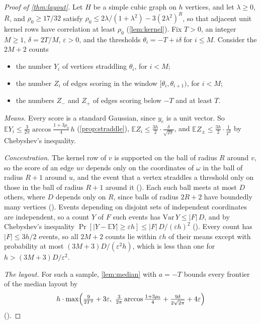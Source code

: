 \documentclass[11pt]{article}
\theoremstyle{plain}
\theoremstyle{definition}
\theoremstyle{remark}
\newcommand{\card}[1]{\lvert #1\rvert}
\begin{document}
\begin{proof}[Proof of \cref{thm:layout}]
Let $H$ be a simple cubic graph on $h$ vertices, and let $\lambda \ge 0$, $R$, and
$\rho_0 \ge 17/32$ satisfy $\rho_0 \le 2\lambda/(1+\lambda^2) - 3(2\lambda^2)^R$, so that adjacent
unit kernel rows have correlation at least $\rho_0$ (\cref{lem:kernel}). Fix $T > 0$, an integer
$M \ge 1$, $\delta = 2T/M$, $\varepsilon > 0$, and the thresholds $\theta_i = -T + i\delta$ for
$i \le M$. Consider the $2M + 2$ counts
\begin{itemize}
\item the number $Y_i$ of vertices straddling $\theta_i$, for $i < M$;
\item the number $Z_i$ of edges scoring in the window $[\theta_i, \theta_{i+1})$, for $i < M$;
\item the numbers $Z_-$ and $Z_+$ of edges scoring below $-T$ and at least $T$.
\end{itemize}
\emph{Means.} Every score is a standard Gaussian, since $y_e$ is a unit vector. So
$\mathbb{E} Y_i \le \frac{3}{2\pi}\arccos\frac{1+3\rho_0}{4}\,h$ (\cref{prop:straddle}),
$\mathbb{E} Z_i \le \frac{3h}{2}\cdot\frac{\delta}{\sqrt{2\pi}}$, and
$\mathbb{E} Z_\pm \le \frac{3h}{2}\cdot\frac{1}{T^2}$ by Chebyshev's inequality.

\emph{Concentration.} The kernel row of $v$ is supported on the ball of radius $R$ around $v$, so
the score of an edge $uv$ depends only on the coordinates of $\omega$ in the ball of radius $R + 1$
around $u$, and the event that a vertex straddles a threshold only on those in the ball of radius
$R + 1$ around it (). Each such ball meets at most
$D$ others, where $D$ depends only on $R$, since balls of radius $2R + 2$ have boundedly many
vertices (). Events depending on disjoint sets of
independent coordinates are independent, so a count $Y$ of $F$ such events has
$\mathrm{Var}\,Y \le \card F\, D$, and by Chebyshev's inequality
$\Pr[\card{Y - \mathbb E Y} \ge \varepsilon h] \le \card F\, D/(\varepsilon h)^2$
(). Every count has $\card F \le 3h/2$ events, so all
$2M + 2$ counts lie within $\varepsilon h$ of their means except with probability at most
$(3M + 3)D/(\varepsilon^2 h)$, which is less than one for $h > (3M+3)D/\varepsilon^2$.

\emph{The layout.} For such a sample, \cref{lem:median} with $a = -T$ bounds every frontier of
the median layout by
\[
  h\cdot\max\Bigl(\tfrac{9}{2T^2} + 3\varepsilon,\
  \tfrac{3}{2\pi}\arccos\tfrac{1+3\rho_0}{4} + \tfrac{9\delta}{2\sqrt{2\pi}} + 4\varepsilon\Bigr)
\]
().


\end{proof}
\end{document}
